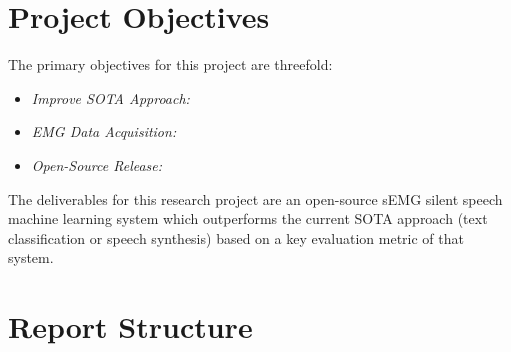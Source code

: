 \section{Project Objectives}

The primary objectives for this project are threefold:

\begin{itemize}
    \item \textit{Improve SOTA Approach:}
    \item \textit{EMG Data Acquisition:}
    \item \textit{Open-Source Release:}
\end{itemize}

The deliverables for this research project are an open-source
sEMG silent speech machine learning system which outperforms the current
SOTA approach (text classification or speech synthesis) based on a key
evaluation metric of that system.

\section{Report Structure}